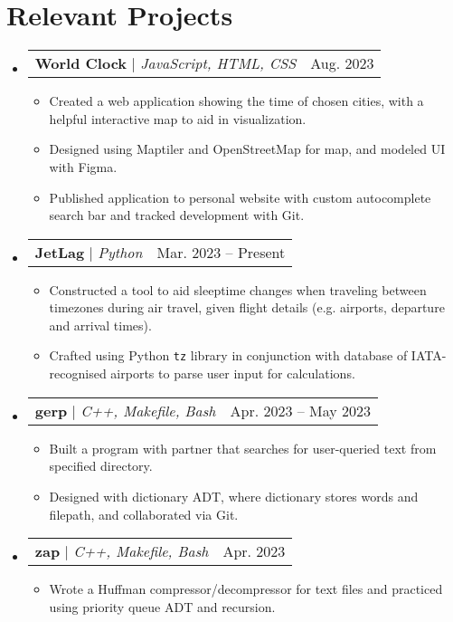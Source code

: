 \documentclass[letterpaper,11pt]{article}
\makeatletter
\newcommand{\resumeItem}[1]{
  \item\small{
    {#1 \vspace{-2pt}}
  }
}
\newcommand{\resumeProjectHeading}[2]{
    \item
    \begin{tabular*}{0.97\textwidth}{l@{\extracolsep{\fill}}r}
      \small#1 & #2 \\
    \end{tabular*}\vspace{-7pt}
}
\newcommand{\resumeSubHeadingListStart}{\begin{itemize}[leftmargin=0.15in, label={}]}
\newcommand{\resumeSubHeadingListEnd}{\end{itemize}}
\newcommand{\resumeItemListStart}{\begin{itemize}}
\newcommand{\resumeItemListEnd}{\end{itemize}\vspace{-5pt}}
\makeatother
\begin{document}
\section{Relevant Projects}
    \resumeSubHeadingListStart
    \resumeProjectHeading
        {\textbf{World Clock} $|$ \emph{JavaScript, HTML, CSS}}{Aug. 2023}
        \resumeItemListStart
          \resumeItem{Created a web application showing the time of chosen cities, with a helpful interactive map to aid in visualization.}
          \resumeItem{Designed using Maptiler and OpenStreetMap for map, and modeled UI with Figma.}
          \resumeItem{Published application to personal website with custom autocomplete search bar and tracked development with Git.}\resumeItemListEnd
    \resumeProjectHeading
          {\textbf{JetLag} $|$ \emph{Python}}{Mar. 2023 – Present}
          \resumeItemListStart
            \resumeItem{Constructed a tool to aid sleeptime changes when traveling between timezones during air travel,
            given flight details (e.g. airports, departure and arrival
            times).}
            \resumeItem{Crafted using Python \texttt{tz} library in conjunction with database of
            IATA-recognised airports to parse user input for calculations.}
          \resumeItemListEnd
      \resumeProjectHeading
          {\textbf{gerp} $|$ \emph{C++, Makefile, Bash}}{Apr. 2023 – May 2023}
          \resumeItemListStart
            \resumeItem{Built a program with partner that searches for user-queried text from specified directory.}
            \resumeItem{Designed with dictionary ADT, where dictionary stores words and filepath, and collaborated via Git.}
          \resumeItemListEnd
          \resumeProjectHeading
          {\textbf{zap} $|$ \emph{C++, Makefile, Bash}}{Apr. 2023}
          \resumeItemListStart
          \resumeItem{Wrote a Huffman compressor/decompressor for text files and practiced using priority queue ADT and recursion.}
          \resumeItemListEnd
    \resumeSubHeadingListEnd
\end{document}
